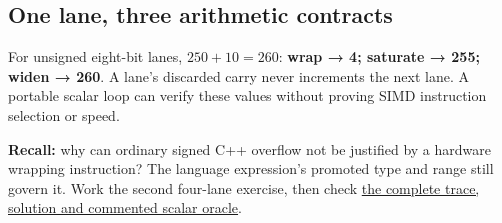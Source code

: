 \subsection{One lane, three arithmetic contracts}\label{one-lane-three-arithmetic-contracts}

For unsigned eight-bit lanes, \(250+10=260\): \textbf{wrap → 4; saturate → 255; widen → 260}. A lane's discarded carry never increments the next lane. A portable scalar loop can verify these values without proving SIMD instruction selection or speed.

\textbf{Recall:} why can ordinary signed C++ overflow not be justified by a hardware wrapping instruction? The language expression's promoted type and range still govern it. Work the second four-lane exercise, then check \href{Continuous\%20Notes/Computing\%20Foundations\%20-\%20From\%20Bits\%20to\%20C++\%20and\%20Systems\%20APIs\#Three\%20lane-arithmetic\%20contracts:\%20wrap,\%20saturate\%20and\%20widen}{the complete trace, solution and commented scalar oracle}.

